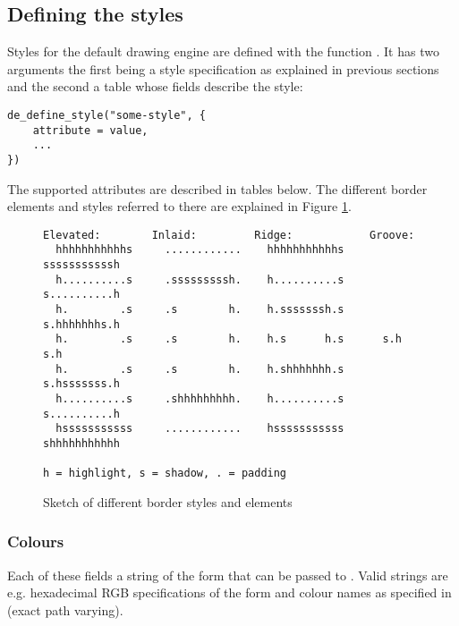 \subsection{Defining the styles}

Styles for the default drawing engine are defined with the
function . It has two arguments the first being
a style specification as explained in previous sections and the second
a table whose fields describe the style:

\begin{verbatim}
de_define_style("some-style", {
    attribute = value,
    ...
})
\end{verbatim}

The supported attributes are described in tables below. The different
border elements and styles referred to there are explained in Figure
\ref{fig:borders}.

\begin{figure}
\begin{htmlonly}
\docode %
\end{htmlonly}    
\begin{verbatim}
Elevated:        Inlaid:         Ridge:            Groove:        
  hhhhhhhhhhhs     ............	   hhhhhhhhhhhs      sssssssssssh
  h..........s     .sssssssssh.	   h..........s      s..........h
  h.        .s     .s        h.	   h.sssssssh.s      s.hhhhhhhs.h
  h.        .s     .s        h.	   h.s      h.s      s.h      s.h
  h.        .s     .s        h.	   h.shhhhhhh.s      s.hsssssss.h
  h..........s     .shhhhhhhhh.	   h..........s      s..........h
  hsssssssssss     ............	   hsssssssssss      shhhhhhhhhhh

h = highlight, s = shadow, . = padding
\end{verbatim}
\caption{Sketch of different border styles and elements}
\label{fig:borders}
\end{figure}

\subsubsection{Colours}

Each of these fields a string of the form that can be
passed to . Valid strings are e.g.
hexadecimal RGB specifications of the form
 and colour names as specified
in  (exact path varying).

